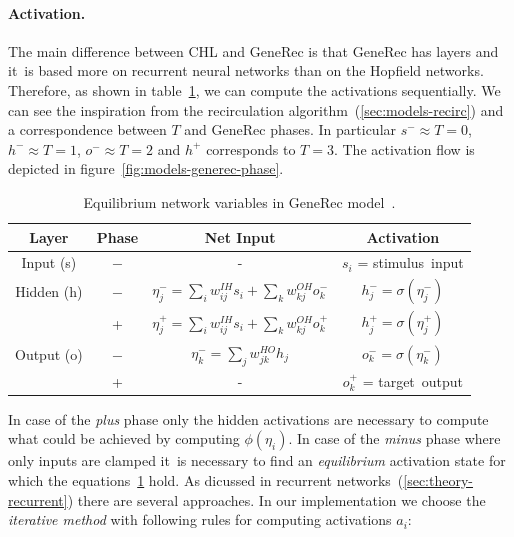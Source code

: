 \paragraph{Activation.} 
\label{sec:models-generec-activation} 
The main difference between CHL and GeneRec is that GeneRec has layers and it~is based more on recurrent neural networks than on the Hopfield networks. Therefore, as shown in table~\ref{tab:models-generec}, we can compute the activations sequentially. We can see the inspiration from the recirculation algorithm~(\ref{sec:models-recirc}) and a correspondence between $T$ and GeneRec phases. In particular $s^{-} \approx T=0$, $h^{-} \approx T=1$, $o^{-} \approx T=2$ and $h^{+}$ corresponds to $T=3$. The activation flow is depicted in figure~\ref{fig:models-generec-phase}.
\begin{table}[H]
  \centering
  \begin{tabular}{|cccc|}
    \hline
    Layer & Phase & Net Input & Activation\\
    \hline
    Input (s)    & $-$ & - & $s_i$ = \mbox{stimulus input} \\
    \hline
    Hidden (h)   & $-$ & \hspace{0.3cm}$\eta^{-}_j = \sum_i w_{ij}^{IH}s_i + \sum_k w_{kj}^{OH}o^{-}_k$\hspace{0.3cm} &
    $h^{-}_j = \sigma(\eta^{-}_j)$\hspace{0.3cm}\\
          &  +  & $\eta^{+}_j = \sum_{i}w_{ij}^{IH}s_i + \sum_k w_{kj}^{OH}o^{+}_k$ & $h^{+}_{j} = \sigma(\eta^{+}_j)$ \\
    \hline
    Output (o) & $-$ & $\eta^{-}_k = \sum_j w_{jk}^{HO}h_j$ & $o^{-}_k = \sigma(\eta^{-}_k)$\\
           &  +  & - & $o^{+}_k$ = \mbox{target output} \\ %
    \hline
  \end{tabular}
  \caption{Equilibrium network variables in GeneRec model~\citet{o1996bio}.}
  \label{tab:models-generec}
\end{table}
In case of the \emph{plus} phase only the hidden activations are necessary to compute what could be achieved by computing $\phi(\eta_i)$. In case of the \emph{minus} phase where only inputs are clamped it~is necessary to find an \emph{equilibrium} activation state for which the equations~\ref{tab:models-generec} hold. As dicussed in recurrent networks~(\ref{sec:theory-recurrent}) there are several approaches. In our implementation we choose the \emph{iterative method} with following rules for computing activations $a_i$: 
